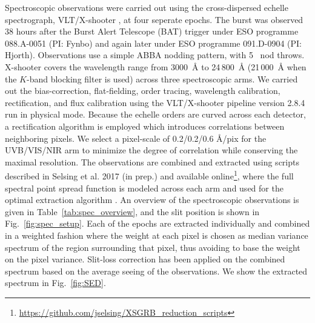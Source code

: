 \documentclass[referee]{aa}
\newcommand{\lya}{Ly$\alpha$}
\begin{document}
\begin{figure*}
	\centering
	\caption{Best-fit SED to the derived photometry. The detection of \lya{}  is predicted from the SED fit and confirmed by the spectroscopic observations. Overplotted in grey is the observed spectrum, binned by 6 \AA{} for presentation purposes. Slit losses has been corrected for based on the average seeing of the observations, as confirmed by the comparison with the photometry. The blue, dashed line is the corresponding error spectrum, smoothed for presentation purposes. The reason for the spectral gaps at 5500 \AA{} and 10000 \AA{} is from the merging of the arms.}
	\label{fig:SED}
\end{figure*}

Spectroscopic observations were carried out using the cross-dispersed echelle
spectrograph, VLT/X-shooter \citep{Vernet2011}, at four seperate epochs. The
burst was observed 38 hours after the Burst Alert Telescope (BAT) trigger under
ESO programme 088.A-0051 (PI: Fynbo) and again later under ESO programme
091.D-0904 (PI: Hjorth). Observations use a simple ABBA nodding pattern, with 5
\arcsec~nod throws. X-shooter covers the wavelength range from 3000~\AA{} to
24\,800~\AA{} (21\,000~\AA{} when the $K$-band blocking filter is used) across
three spectroscopic arms. We carried out the bias-correction, flat-fielding,
order tracing, wavelength calibration, rectification, and flux calibration using
the VLT/X-shooter pipeline version 2.8.4 \citep{Goldoni2006, Modigliani2010} run
in physical mode. Because the echelle orders are curved across each detector, a
rectification algorithm is employed which introduces correlations between
neighboring pixels. We select a pixel-scale of 0.2/0.2/0.6 \AA/pix for the
UVB/VIS/NIR arm to minimize the degree of correlation while conserving the
maximal resolution. The observations are combined and extracted using scripts
described in Selsing et al. 2017 (in prep.) and available
online\footnote{\url{https://github.com/jselsing/XSGRB_reduction_scripts}},
where the full spectral point spread function is modeled across each arm and
used for the optimal extraction algorithm \citep{Horne1986}. An overview of the
spectroscopic observations is given in Table~\ref{tab:spec_overview}, and the
slit position is shown in Fig.~\ref{fig:spec_setup}. Each of the epochs are
extracted individually and combined in a weighted fashion where the weight at
each pixel is chosen as median variance spectrum of the region surrounding that
pixel, thus avoiding to base the weight on the pixel variance. Slit-loss
correction has been applied on the combined spectrum based on the average seeing
of the observations. We show the extracted spectrum in Fig.~\ref{fig:SED}.
\end{document}
